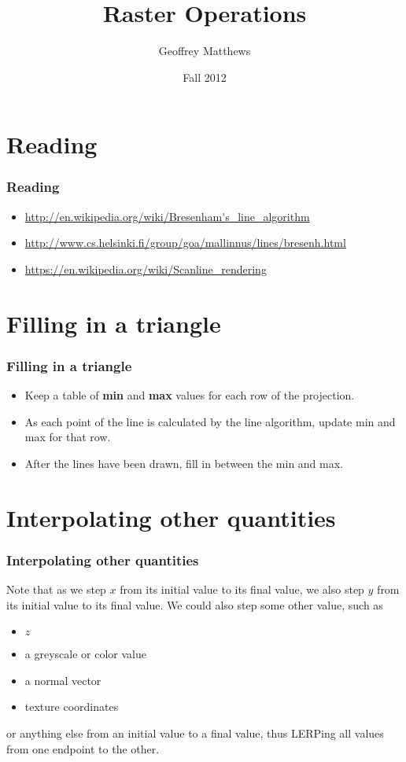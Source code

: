 \documentclass{beamer}
\title
{
Raster Operations
}
\subtitle{} %
\author[Geoffrey Matthews]
{Geoffrey Matthews}
\institute[WWU/CS]
{
  Department of Computer Science\\
  Western Washington University
}
\date{Fall 2012}
\newcommand{\sect}[1]{
\section{#1}
\begin{frame}[fragile]\frametitle{#1}
}
\begin{document}
\begin{frame}
  \titlepage
\end{frame}


\newcommand{\myref}[1]{\small\item\url{#1}}
\newcommand{\myreft}[1]{\footnotesize\item\url{#1}}



\sect{Reading}

\begin{itemize}
\myref{http://en.wikipedia.org/wiki/Bresenham's_line_algorithm}
\myref{http://www.cs.helsinki.fi/group/goa/mallinnus/lines/bresenh.html}
\myref{https://en.wikipedia.org/wiki/Scanline_rendering}
\end{itemize}

\end{frame}

\sect{Filling in a triangle}
\begin{itemize}
\item Keep a table of {\bf min} and {\bf max} values for each row of the 
projection.
\item As each point of the line is calculated by the line algorithm,
update min and max for that row.
\item After the lines have been drawn, fill in between the min and max.
\end{itemize}
\end{frame}

\sect{Interpolating other quantities}

Note that as we step $x$ from its initial value to its final value, we
also step $y$ from its initial value to its final value.  We could
also step some other value, such as
\begin{itemize}
\item  $z$
\item a greyscale or color value
\item a normal vector
\item texture coordinates
\end{itemize}
or anything else from an initial value to a final value, thus
LERPing all values from one endpoint to the other.

\end{frame}
\end{document}
